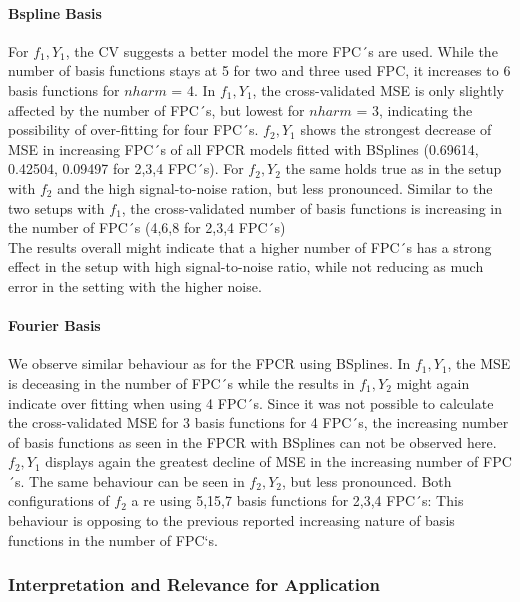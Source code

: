 \documentclass[11pt,twoside,a4paper]{article}
\begin{document}
	\paragraph{Bspline Basis}
	For $f_1,Y_1$, the CV suggests a better model the more FPC´s are used. While the number of basis functions stays at 5 for two and three used FPC, it increases to 6 basis functions for $nharm$ = 4. In $f_1,Y_1$, the cross-validated MSE is only slightly affected by the number of FPC´s, but lowest for $nharm$ = 3, indicating the possibility of over-fitting for four FPC´s. $f_2,Y_1$ shows the strongest decrease of MSE in increasing FPC´s of all FPCR models fitted with BSplines (0.69614, 0.42504, 0.09497 for 2,3,4 FPC´s). For $f_2,Y_2$ the same holds true as in the setup with $f_2$ and the high signal-to-noise ration, but less pronounced. Similar to the two setups with $f_1$, the cross-validated number of basis functions is increasing in the number of FPC´s (4,6,8 for 2,3,4 FPC´s)\\
	The results overall might indicate that a higher number of FPC´s has a strong effect in the setup with high signal-to-noise ratio, while not reducing as much error in the setting with the higher noise.
	
	\paragraph{Fourier Basis}
	We observe similar behaviour as for the FPCR using BSplines. In $f_1,Y_1$, the MSE is deceasing in the number of FPC´s while the results in $f_1,Y_2$ might again indicate over fitting when using 4 FPC´s. Since it was not possible to calculate the cross-validated MSE for 3 basis functions for 4 FPC´s, the increasing number of basis functions as seen in the FPCR with BSplines can not be observed here. $f_2,Y_1$ displays again the greatest decline of MSE in the increasing number of FPC´s. The same behaviour can be seen in $f_2,Y_2$, but less pronounced. Both configurations of $f_2$ a re using 5,15,7 basis functions for 2,3,4 FPC´s: This behaviour is opposing to the previous reported increasing nature of basis functions in the number of FPC`s.
	
	\subsubsection{Interpretation and Relevance for Application}
	

	
\end{document}
